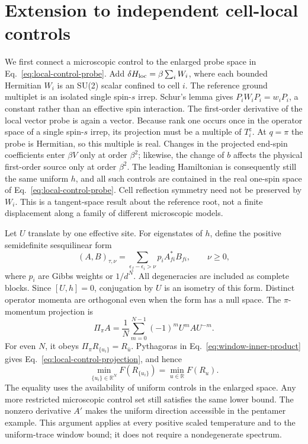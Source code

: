 \section{Extension to independent cell-local controls}
\label{app:local-controls}

We first connect a microscopic control to the enlarged probe space in
Eq.~\eqref{eq:local-control-probe}. Add
$\delta H_{\rm loc}=\beta\sum_i W_i$, where each bounded Hermitian $W_i$
is an SU(2) scalar confined to cell $i$. The reference ground multiplet is
an isolated single spin-$s$ irrep. Schur's lemma gives
$P_iW_iP_i=w_iP_i$, a constant rather than an effective spin interaction.
The first-order derivative of the local vector probe is again a vector.
Because rank one occurs once in the operator space of a single spin-$s$
irrep, its projection must be a multiple of $T_i^z$. At $q=\pi$ the
probe is Hermitian, so this multiple is real. Changes in the projected
end-spin coefficients enter $\beta V$ only at order $\beta^2$;
likewise, the change of $b$ affects the physical first-order source only
at order $\beta^2$. The leading Hamiltonian is consequently still the
same uniform $h$, and all such controls are contained in the real
one-spin space of Eq.~\eqref{eq:local-control-probe}. Cell reflection
symmetry need not be preserved by $W_i$. This is a tangent-space result
about the reference root, not a finite displacement along a family of
different microscopic models.

Let $U$ translate by one effective site. For eigenstates of $h$, define
the positive semidefinite sesquilinear form
\begin{equation}
 (A,B)_{\tau,\nu}=\sum_{\epsilon_f-\epsilon_i>\nu}
 p_i A_{fi}^*B_{fi},\qquad \nu\ge0,
 \label{eq:window-inner-product}
\end{equation}
where $p_i$ are Gibbs weights or $1/d^N$. All degeneracies are included
as complete blocks. Since $[U,h]=0$, conjugation by $U$ is an isometry
of this form. Distinct operator momenta are orthogonal even when the
form has a null space. The $\pi$-momentum projection is
\begin{equation}
 \Pi_\pi A=\frac1N\sum_{m=0}^{N-1}(-1)^mU^m A U^{-m}.
\end{equation}
For even $N$, it obeys
$\Pi_\pi R_{\{u_i\}}=R_{\bar u}$. Pythagoras in
Eq.~\eqref{eq:window-inner-product} gives
Eq.~\eqref{eq:local-control-projection}, and hence
\begin{equation}
 \min_{\{u_i\}\in\mathbb R^N}F(R_{\{u_i\}})
 =\min_{u\in\mathbb R}F(R_u).
 \label{eq:local-control-optimum}
\end{equation}
The equality uses the availability of uniform controls in the enlarged
space. Any more restricted microscopic control set still satisfies the
same lower bound. The nonzero derivative $A'$ makes the uniform direction
accessible in the pentamer example. This argument applies at every
positive scaled temperature and to the uniform-trace window bound;
it does not require a nondegenerate spectrum.

